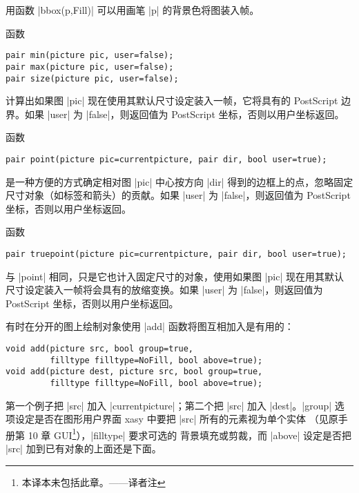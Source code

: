 \documentclass[nofonts,CJKnormalspaces]{ctexbook}[2009/05/20]
\makeatletter
\newenvironment{typelist}{\itemize
  \let\old@item\@item
  \def\@item[##1]{\expandafter\old@item[\ttfamily\color{type!50!black}##1]}}
{\enditemize}
\newcommand*\prgname[1]{\textsf{#1}}
\newcommand\transnote[1]{\footnote{#1——译者注}}
\makeatother
\begin{document}
\begin{typelist}
用函数 |bbox(p,Fill)| 可以用画笔 |p| 的背景色将图装入帧。

函数
\begin{lstlisting}
pair min(picture pic, user=false);
pair max(picture pic, user=false);
pair size(picture pic, user=false);
\end{lstlisting}
计算出如果图 |pic| 现在使用其默认尺寸设定装入一帧，它将具有的
\prgname{PostScript} 边界。如果 |user| 为 |false|，则返回值为
\prgname{PostScript} 坐标，否则以用户坐标返回。

函数
\begin{lstlisting}
pair point(picture pic=currentpicture, pair dir, bool user=true);
\end{lstlisting}
是一种方便的方式确定相对图 |pic| 中心按方向 |dir| 得到的边框上的点，忽略固定
尺寸对象（如标签和箭头）的贡献。如果 |user| 为 |false|，则返回值为
\prgname{PostScript} 坐标，否则以用户坐标返回。

函数
\begin{lstlisting}
pair truepoint(picture pic=currentpicture, pair dir, bool user=true);
\end{lstlisting}
与 |point| 相同，只是它也计入固定尺寸的对象，使用如果图 |pic| 现在用其默认
尺寸设定装入一帧将会具有的放缩变换。如果 |user| 为 |false|，则返回值为
\prgname{PostScript} 坐标，否则以用户坐标返回。

有时在分开的图上绘制对象使用 |add| 函数将图互相加入是有用的：
\begin{lstlisting}
void add(picture src, bool group=true,
         filltype filltype=NoFill, bool above=true);
void add(picture dest, picture src, bool group=true,
         filltype filltype=NoFill, bool above=true);
\end{lstlisting}
第一个例子把 |src| 加入 |currentpicture|；第二个把 |src| 加入 |dest|。|group|
选项设定是否在图形用户界面 \prgname{xasy} 中要把 |src| 所有的元素视为单个实体
（见原手册第 10 章 GUI\transnote{本译本未包括此章。}），|filltype| 要求可选的
背景填充或剪裁，而 |above| 设定是否把 |src| 加到已有对象的上面还是下面。


\end{typelist}
\end{document}
